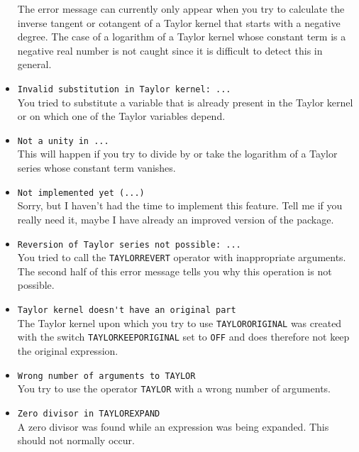 \begin{itemize}
    The error message can currently only appear when you try to
    calculate the inverse tangent or cotangent of a Taylor
    kernel that starts with a negative degree.
    The case of a logarithm of a Taylor kernel whose constant term
    is a negative real number is not caught since it is
    difficult to detect this in general.

\item \verb|Invalid substitution in Taylor kernel: ...|\\
    You tried to substitute a variable that is already present in the
    Taylor kernel or on which one of the Taylor variables depend.

\item \verb|Not a unity in ...|\\
    This will happen if you try to divide by or take the logarithm of
    a Taylor series whose constant term vanishes.

\item \verb|Not implemented yet (...)|\\
    Sorry, but I haven't had the time to implement this feature.
    Tell me if you really need it, maybe I have already an improved
    version of the package.

\item \verb|Reversion of Taylor series not possible: ...|\\
    You tried to call the \verb|TAYLORREVERT| operator with
    inappropriate arguments. The second half of this error message
    tells you why this operation is not possible.

\item \verb|Taylor kernel doesn't have an original part|\\
 
    The Taylor kernel upon which you try to use \verb|TAYLORORIGINAL|
    was created with the switch \verb|TAYLORKEEPORIGINAL|
    set to \verb|OFF|
    and does therefore not keep the original expression.

\item \verb|Wrong number of arguments to TAYLOR|\\
    You try to use the operator \verb|TAYLOR| with a wrong number of
    arguments.

\item \verb|Zero divisor in TAYLOREXPAND|\\
    A zero divisor was found while an expression was being expanded.
    This should not normally occur.


\end{itemize}
